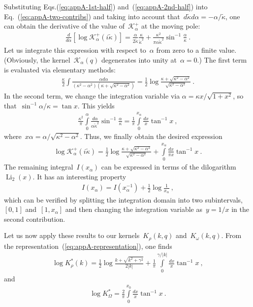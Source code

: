 \documentclass[preprint,aps,eqsecnum]{revtex4-1}
\newcommand{\fplus}[1]{{#1}^{+}}
\begin{document}
Substituting Eqs.(\ref{eq:appA-1st-half}) and~(\ref{eq:appA-2nd-half})
into Eq.~(\ref{eq:appA-two-contribs}) and taking into account
that~$d{\tilde \kappa}{d\alpha} =  - \alpha/{\tilde\kappa}$,
one can obtain the derivative of the value of~$\fplus{\mathcal{K}}_\alpha$
at the moving pole:
\begin{align}
  \frac{d}{d\alpha} [\log \fplus{\mathcal{K}}_\alpha(i{\tilde \kappa})] =
  \frac{\alpha}{2{\tilde\kappa}} \frac{\kappa}{{\tilde\kappa}^2}
  + \frac{\kappa^2}{\pi\alpha{\tilde\kappa}^2} \sin^{-1}\frac{\alpha}{\kappa}
  \ . 
\end{align}
Let us integrate this expression with respect to~$\alpha$
from zero to a finite value. (Obviously, the kernel~$\mathcal{K}_\alpha(q)$
degenerates into unity at~$\alpha = 0$.)
The first term is evaluated via elementary methods:
\begin{align}
  \frac{\kappa}{2} \int \frac{\alpha d\alpha}{(\kappa^2 - \alpha^2)
  (\kappa + \sqrt{\kappa^2 - \alpha^2})}
  = \frac{1}{2} \log\frac{\kappa + \sqrt{\kappa^2 - \alpha^2}}{
    \sqrt{\kappa^2 - \alpha^2}}\ . 
\end{align}
In the second term, we change the integration variable via
$\alpha = \kappa x / \sqrt{1 + x^2}$,
so that~$\sin^{-1} \alpha/\kappa = \tan x$. This yields
\begin{align}
  \frac{\kappa^2}{\pi} \int\limits_{0}^{\alpha}
  \frac{d\alpha}{\alpha{\tilde\kappa}^2} \sin^{-1}\frac{\alpha}{\kappa}
  = \frac{1}{\pi} \int\limits_{0}^{x_\alpha} \frac{dx}{x} \tan^{-1} x\ ,
\end{align}
where~$x\alpha = \alpha/\sqrt{\kappa^2 - \alpha^2}$.
Thus, we finally obtain the desired expression
\begin{align}
  \log \fplus{\mathcal{K}}_\alpha(i{\tilde \kappa})
  = \frac{1}{2}\log\frac{\kappa + \sqrt{\kappa^2 - \alpha^2}}{
  \sqrt{\kappa^2 - \alpha^2}}
  + \int\limits_{0}^{x_\alpha}\frac{dx}{\pi x} \tan^{-1} x\ . 
\end{align}
The remaining integral~$I(x_\alpha)$
can be expressed in terms of the dilogarithm
$\mathop{\mathrm{Li}}_2(x)$. It has an interesting property
\begin{align}
I(x_\alpha) = I(x_\alpha^{-1}) + \frac{1}{2} \log\frac{1}{x_\alpha}\ ,   
\end{align}
which can be verified by splitting the integration domain
into two subintervals,~$[0, 1]$ and~$[1, x_\alpha]$ and
then changing the integration variable as~$y = 1/x$ in the
second contribution.

Let us now apply these results to our kernels~$K_\rho(k, q)$
and~$K_\omega(k, q)$. From the representation~(\ref{eq:appA-representation}),
one finds
\begin{align}
  \log K_\rho^\ast(k) =  \frac{1}{2} \log\frac{k + \sqrt{k^2 + \gamma^2}}{2|k|}
  + \frac{1}{\pi}\int\limits_{0}^{\gamma/|k|}
  \frac{dx}{x} \tan^{-1}x
\ , 
\end{align}
and
\begin{align} 
  \log K_\Omega^\ast =  \frac{2}{\pi}
  \int\limits_{0}^{x_0} \frac{dx}{x}\tan^{-1}x
\ .   
\end{align}
\end{document}
